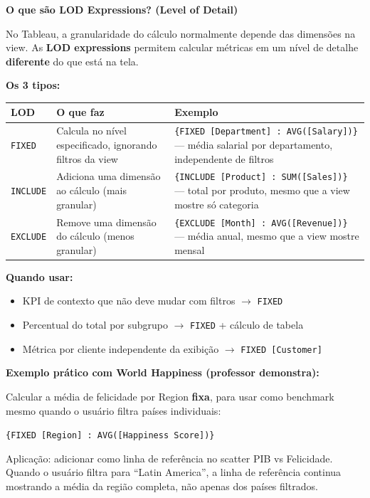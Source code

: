 \begin{BoardBox}
\textbf{O que são LOD Expressions? (Level of Detail)}

No Tableau, a granularidade do cálculo normalmente depende das dimensões
na view. As \textbf{LOD expressions} permitem calcular métricas em um
nível de detalhe \textbf{diferente} do que está na tela.

\textbf{Os 3 tipos:}
\begin{tabular}{|l|p{5cm}|p{5.5cm}|}
\hline
\textbf{LOD} & \textbf{O que faz} & \textbf{Exemplo} \\
\hline
\texttt{FIXED} & Calcula no nível especificado,
ignorando filtros da view &
\texttt{\{FIXED [Department] : AVG([Salary])\}} —
média salarial por departamento, independente de filtros \\
\hline
\texttt{INCLUDE} & Adiciona uma dimensão ao
cálculo (mais granular) &
\texttt{\{INCLUDE [Product] : SUM([Sales])\}} —
total por produto, mesmo que a view mostre só categoria \\
\hline
\texttt{EXCLUDE} & Remove uma dimensão do
cálculo (menos granular) &
\texttt{\{EXCLUDE [Month] : AVG([Revenue])\}} —
média anual, mesmo que a view mostre mensal \\
\hline
\end{tabular}

\textbf{Quando usar:}
\begin{itemize}
  \item KPI de contexto que não deve mudar com filtros $\to$ \texttt{FIXED}
  \item Percentual do total por subgrupo $\to$ \texttt{FIXED} + cálculo de tabela
  \item Métrica por cliente independente da exibição $\to$ \texttt{FIXED [Customer]}
\end{itemize}
\end{BoardBox}

\begin{SolvedBox}
\textbf{Exemplo prático com World Happiness (professor demonstra):}

Calcular a média de felicidade por Region \textbf{fixa}, para usar como
benchmark mesmo quando o usuário filtra países individuais:

\texttt{\{FIXED [Region] : AVG([Happiness Score])\}}

Aplicação: adicionar como linha de referência no scatter PIB vs Felicidade.
Quando o usuário filtra para ``Latin America'', a linha de referência
continua mostrando a média da região completa, não apenas dos países
filtrados.
\end{SolvedBox}

